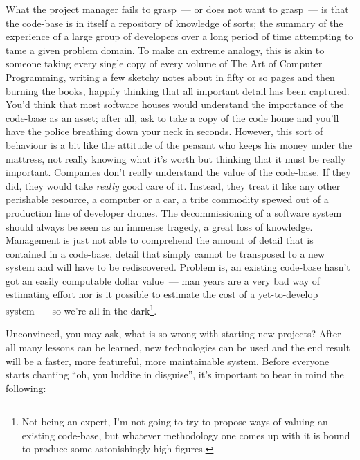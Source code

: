 \documentclass{book}
\begin{document}
What the project manager fails to grasp~--- or does not want to
grasp~--- is that the code-base is in itself a repository of knowledge
of sorts; the summary of the experience of a large group of developers
over a long period of time attempting to tame a given problem
domain. To make an extreme analogy, this is akin to someone taking
every single copy of every volume of The Art of Computer Programming,
writing a few sketchy notes about in fifty or so pages and then
burning the books, happily thinking that all important detail has been
captured. You'd think that most software houses would understand the
importance of the code-base as an asset; after all, ask to take a copy
of the code home and you'll have the police breathing down your neck
in seconds. However, this sort of behaviour is a bit like the attitude
of the peasant who keeps his money under the mattress, not really
knowing what it's worth but thinking that it must be really
important. Companies don't really understand the value of the
code-base. If they did, they would take \emph{really} good care of
it. Instead, they treat it like any other perishable resource, a
computer or a car, a trite commodity spewed out of a production line
of developer drones. The decommissioning of a software system should
always be seen as an immense tragedy, a great loss of
knowledge. Management is just not able to comprehend the amount of
detail that is contained in a code-base, detail that simply cannot be
transposed to a new system and will have to be rediscovered. Problem
is, an existing code-base hasn't got an easily computable dollar
value~--- man years are a very bad way of estimating effort nor is it
possible to estimate the cost of a yet-to-develop system~--- so we're
all in the dark\footnote{Not being an expert, I'm not going to try to
  propose ways of valuing an existing code-base, but whatever
  methodology one comes up with it is bound to produce some
  astonishingly high figures.}.

Unconvinced, you may ask, what is so wrong with starting new projects?
After all many lessons can be learned, new technologies can be used
and the end result will be a faster, more featureful, more
maintainable system. Before everyone starts chanting ``oh, you luddite
in disguise'', it's important to bear in mind the following:
\end{document}
